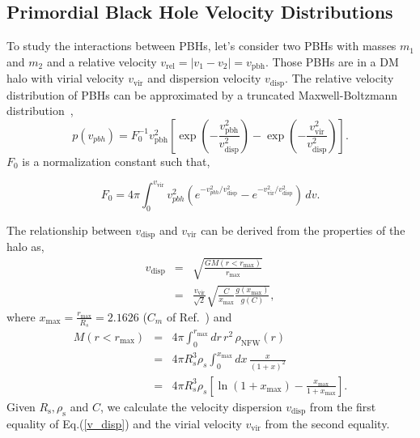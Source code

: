 \documentclass[aps, prd, reprint, nofootinbib]{revtex4-2}
\begin{document}
\subsection{Primordial Black Hole Velocity Distributions}
To study the interactions between PBHs, let's consider two PBHs with masses $m_1$ and $m_2$ and a relative velocity $v_{\textrm{rel}} = |v_1 - v_2| = v_{\textrm{pbh}}$. 
Those PBHs are in a DM halo with virial velocity $v_{\textrm{vir}}$ and dispersion velocity $v_{\textrm{disp}}$. 
The relative velocity distribution of PBHs can be approximated by a truncated Maxwell-Boltzmann distribution~\cite{Bird:2016dcv, Cholis:2016kqi},
\begin{equation}
p(v_{pbh}) = F_0^{-1} v_{\textrm{pbh}}^{2}\left[\exp\left(-\frac{v_{\textrm{pbh}}^2}{v_{\textrm{disp}}^2}\right) 
- \exp\left(-\frac{v_{\textrm{vir}}^2}{v_{\textrm{disp}}^2}\right)\right]. 
\end{equation}
$F_0$ is a normalization constant such that,


\begin{equation}
F_0 = 4\pi \int_0^{v_{\textrm{vir}}} v_{pbh}^2 \left( e^{-v_{pbh}^2/v_{\textrm{disp}}^2} - e^{-v_{\textrm{vir}}^2/v_{\textrm{disp}}^2} \right) \, dv.
\end{equation}

The relationship between $v_{\textrm{disp}}$ and $v_{\textrm{vir}}$ can be derived from the properties of the halo as, 
\begin{eqnarray}
v_{\textrm{disp}} &=& \sqrt{\frac{G M(r<r_{\textrm{max}})}{r_{\textrm{max}}}} \nonumber \\
&=& \frac{v_{\textrm{vir}}}{\sqrt{2}} \sqrt{\frac{C}{x_{\textrm{max}}} \frac{g(x_{\textrm{max}})}{g(C)}},
\label{v_disp}
\end{eqnarray}
where $x_{\textrm{max}}  = \frac{r_{\textrm{max}}}{R_s} = 2.1626$ ($C_m$ of Ref.~\cite{Bird:2016dcv}) and
\begin{eqnarray}
M(r < r_{\textrm{max}}) &=& 4 \pi \int_0^{r_{\textrm{max}}} dr \, r^2 \, \rho_{\textrm{NFW}}(r) \nonumber \\
&=& 4 \pi R_s^3 \rho_s \int_0^{x_{\textrm{max}}} dx \, \frac{x}{(1 + x)^2} \\
&=& 4 \pi R_s^3 \rho_s \left[\ln(1 + x_{\textrm{max}}) - \frac{x_{\textrm{max}}}{1 + x_{\textrm{max}}}\right]. \nonumber
\end{eqnarray}
Given $R_{\textrm{s}}, \rho_{\textrm{s}}$ and $C$, we calculate the velocity dispersion $v_{\textrm{disp}}$ from the first equality of Eq.(\ref{v_disp}) and the virial velocity $v_{\textrm{vir}}$ from the second equality.
\end{document}
